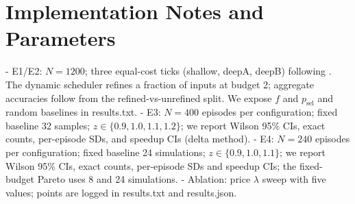\section{Implementation Notes and Parameters}
\label{app:impl}
- E1/E2: $N{=}1200$; three equal-cost ticks (shallow, deepA, deepB) following \cite{Huang2018MSDNet,Wang2018SkipNet}. The dynamic scheduler refines a fraction of inputs at budget 2; aggregate accuracies follow from the refined-vs-unrefined split. We expose $f$ and $p_{\mathrm{sel}}$ and random baselines in results.txt.
- E3: $N{=}400$ episodes per configuration; fixed baseline 32 samples; $z \in \{0.9,1.0,1.1,1.2\}$; we report Wilson 95\% CIs, exact counts, per-episode SDs, and speedup CIs (delta method).
- E4: $N{=}240$ episodes per configuration; fixed baseline 24 simulations; $z \in \{0.9,1.0,1.1\}$; we report Wilson 95\% CIs, exact counts, per-episode SDs and speedup CIs; the fixed-budget Pareto uses 8 and 24 simulations.
- Ablation: price $\lambda$ sweep with five values; points are logged in results.txt and results.json.


